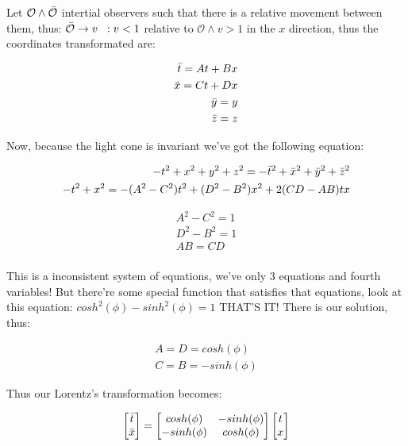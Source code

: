 \documentclass[spanish,notitlepage,letterpaper,11pt]{article} %
\begin{document}
Let $\mathcal{O} \wedge \Bar{\mathcal{O}}$ intertial observers such that there is a relative movement between them, thus: $\Bar{\mathcal{O}} \rightarrow v \;\; : v < 1$ relative to $\mathcal{O} \wedge v > 1$ in the $x$  direction, thus the coordinates transformated are:

\begin{align*}
    \Bar{t} = At + Bx \\
    \Bar{x} = Ct + Dx \\
    \Bar{y} = y\\
    \Bar{z} = z
\end{align*}

Now, because the light cone is invariant we've got the following equation:

\begin{align*}
    -t^2 + x^2 + y^2 + z^2 = -\Bar{t}^2 + \Bar{x}^2 + \Bar{y}^2 + \Bar{z}^2 \\
    -t^2 + x^2 = -(A^2 - C^2)t^2 + (D^2-B^2)x^2 + 2(CD - AB)tx
\end{align*}

\begin{align*}
    A^2 - C^2 = 1\\
    D^2-B^2 = 1\\
    AB = CD\\
\end{align*}

This is a inconsistent system of equations, we've only 3 equations and fourth variables! But there're some special function that satisfies that equations, look at this equation: $cosh^2(\phi) - sinh^2(\phi) = 1$ THAT'S IT! There is our solution, thus: 

\begin{align*}
    A = D = cosh(\phi)\\
    C=B=-sinh(\phi)
\end{align*}

Thus our Lorentz's transformation becomes:

\begin{equation}
    \begin{bmatrix}
    \Bar{t}\\
    \Bar{x}
    \end{bmatrix}
    =
    \begin{bmatrix}
    cosh(\phi) & -sinh(\phi)\\
    -sinh(\phi) & cosh(\phi)
    \end{bmatrix}
    \begin{bmatrix}
    t\\
    x
    \end{bmatrix}
\end{equation}
\end{document}
